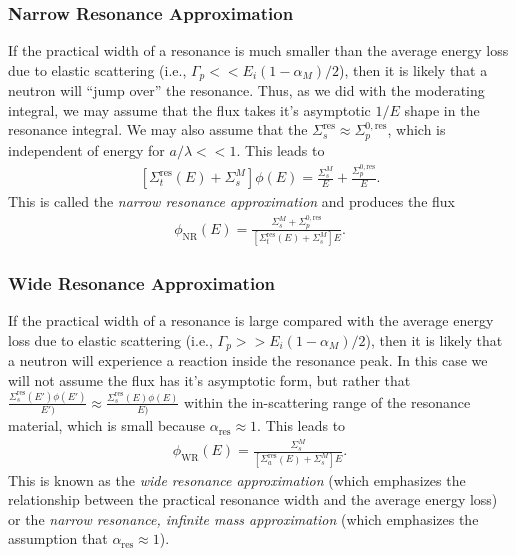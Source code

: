 \documentclass[11pt]{article}
\begin{document}
\subsubsection{Narrow Resonance Approximation}
\label{sec:orgheadline35}
If the practical width of a resonance is much smaller than the average energy loss due to elastic scattering (i.e., \(\Gamma_p << E_i(1-\alpha_M)/2\)), then it is likely that a neutron will ``jump over'' the resonance.  Thus, as we did with the moderating integral, we may assume that the flux takes it's asymptotic \(1/E\) shape in the resonance integral.  We may also assume that the \(\Sigma_s^\text{res} \approx \Sigma_p^{0,\text{res}}\), which is independent of energy for \(a / \lambda << 1\).  This leads to
\begin{align}
  \left[ \Sigma_t^\text{res}(E) + \Sigma_s^M \right] \phi(E)
  = \frac{\Sigma_s^M}{E}
  + \frac{\Sigma_p^{0,\text{res}}}{E}.
\end{align}
This is called the \emph{narrow resonance approximation} and produces the flux
\begin{align}
  \phi_\text{NR}(E)
  = \frac{\Sigma_s^M + \Sigma_p^{0,\text{res}}}{\left[ \Sigma_t^\text{res}(E) + \Sigma_s^M \right]E}.
\end{align}

\subsubsection{Wide Resonance Approximation}
\label{sec:orgheadline36}
If the practical width of a resonance is large compared with the average energy loss due to elastic scattering (i.e., \(\Gamma_p >> E_i(1-\alpha_M)/2\)), then it is likely that a neutron will experience a reaction inside the resonance peak.  In this case we will not assume the flux has it's asymptotic form, but rather that \(\frac{\Sigma_s^\text{res}(E') \phi(E')}{E')} \approx \frac{\Sigma_s^\text{res}(E) \phi(E)}{E)}\) within the in-scattering range of the resonance material, which is small because \(\alpha_\text{res} \approx 1\).  This leads to
\begin{align}
  \phi_\text{WR}(E)
  = \frac{\Sigma_s^M}{\left[ \Sigma_a^\text{res}(E) + \Sigma_s^M \right] E}.
\end{align}
This is known as the \emph{wide resonance approximation} (which emphasizes the relationship between the practical resonance width and the average energy loss) or the \emph{narrow resonance, infinite mass approximation} (which emphasizes the assumption that \(\alpha_\text{res} \approx 1\)).
\end{document}
